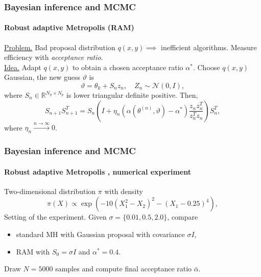 \documentclass{beamer}
\newcommand{\R}{\mathbb{R}}
\begin{document}
\begin{frame}
	\frametitle{Bayesian inference and MCMC}
	\framesubtitle{Robust adaptive Metropolis (RAM) \cite{Vih12}}
	
	\underline{Problem.} Bad proposal distribution $q(x,y) \implies$ inefficient algorithms. Measure efficiency with \textit{acceptance ratio}. \\[0.5cm]
	\underline{Idea.} Adapt $q(x,y)$ to obtain a chosen acceptance ratio $\alpha^*$. Choose $q(x,y)$ Gaussian, the new guess $\vartheta$ is 
	\begin{equation*}
		\vartheta = \theta_k + S_n z_n, \quad Z_n \sim \mathcal{N}(0, I),
	\end{equation*}
	where $S_n \in \R^{N_p\times N_p}$ is lower triangular definite positive. Then, 
	\begin{equation*}
		S_{n+1}S_{n+1}^T = S_n\left(I + \eta_n\left(\alpha(\theta^{(n)}, \vartheta) - \alpha^*\right)\frac{z_nz_n^T}{z_n^Tz_n}\right)S_n^T,
	\end{equation*}
	where $\eta_n \xrightarrow{n\to\infty} 0$.
	
\end{frame}

\begin{frame}
	\frametitle{Bayesian inference and MCMC}
	\framesubtitle{Robust adaptive Metropolis \cite{Vih12}, numerical experiment}
	
	Two-dimensional distribution $\pi$ with density \cite{KaS05}
	\begin{equation*}
		\pi(X) \propto \exp(-10(X_1^2 - X_2)^2 - (X_1 - 0.25)^4),
	\end{equation*}
	Setting of the experiment. Given $\sigma = \{0.01, 0.5, 2.0\}$, compare
	\begin{itemize}
		\item standard MH with Gaussian proposal with covariance $\sigma I$,
		\item RAM with $S_0 = \sigma I$ and $\alpha^* = 0.4$.
	\end{itemize}
	Draw $N = 5000$ samples and compute final acceptance ratio $\bar \alpha$.
\end{frame}
\end{document}
